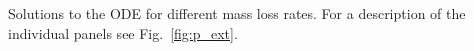 \label{fig:dot_m}
Solutions to the ODE for different mass loss rates. For a description of the individual panels see Fig.~\ref{fig:p_ext}.